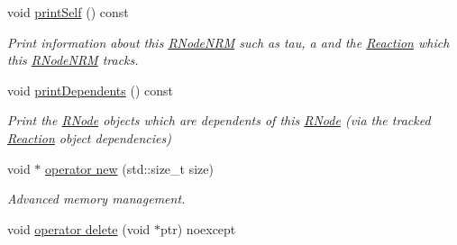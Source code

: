 \begin{DoxyCompactItemize}
void \hyperlink{classchem_1_1RNodeNRM_a1855b936b240d7764907434421258c5a}{print\-Self} () const 
\begin{DoxyCompactList}\small\item\em Print information about this \hyperlink{classchem_1_1RNodeNRM}{R\-Node\-N\-R\-M} such as tau, a and the \hyperlink{classchem_1_1Reaction}{Reaction} which this \hyperlink{classchem_1_1RNodeNRM}{R\-Node\-N\-R\-M} tracks. \end{DoxyCompactList}\item 
void \hyperlink{classchem_1_1RNodeNRM_ad8e5f9557c3ba701596aff928dc5270e}{print\-Dependents} () const 
\begin{DoxyCompactList}\small\item\em Print the \hyperlink{classchem_1_1RNode}{R\-Node} objects which are dependents of this \hyperlink{classchem_1_1RNode}{R\-Node} (via the tracked \hyperlink{classchem_1_1Reaction}{Reaction} object dependencies) \end{DoxyCompactList}\item 
void $\ast$ \hyperlink{classchem_1_1RNodeNRM_ae76175a4d99e9eb3389dce6c77c9edb6}{operator new} (std\-::size\-\_\-t size)
\begin{DoxyCompactList}\small\item\em Advanced memory management. \end{DoxyCompactList}\item 
void \hyperlink{classchem_1_1RNodeNRM_abe32c9de55bd8deb22c2894ae753b708}{operator delete} (void $\ast$ptr) noexcept
\end{DoxyCompactItemize}
